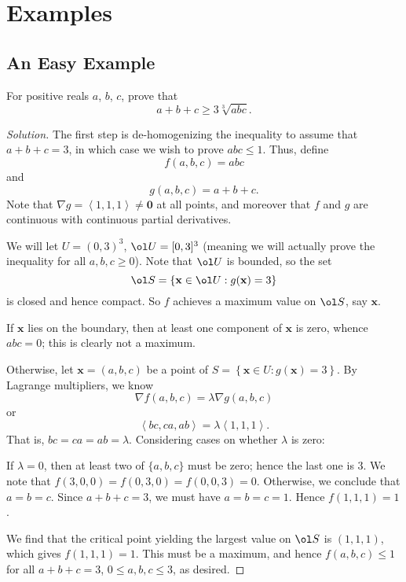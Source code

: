 \documentclass[11pt]{scrartcl}
\begin{document}
\section{Examples}
\subsection{An Easy Example}
\begin{example}
  [AM-GM] For positive reals $a$, $b$, $c$, prove that
  \[ a+b+c \ge 3\sqrt[3]{abc}. \]
\end{example}
\begin{proof}[Solution]
  The first step is de-homogenizing the inequality
  to assume that $a+b+c=3$,
  in which case we wish to prove $abc \le 1$.
  Thus, define
  \[ f(a,b,c) = abc \]
  and
  \[ g(a,b,c) = a+b+c. \]
  Note that $\nabla g = \left<1,1,1\right> \neq \mathbf 0$
  at all points, and moreover that $f$ and $g$ are continuous
  with continuous partial derivatives.

  We will let $U = (0,3)^3$, $\ol U = [0,3]^3$
  (meaning we will actually prove the inequality
  for all $a,b,c \ge 0$).
  Note that $\ol U$ is bounded, so the set
  \[ \ol S = \left\{ \mathbf x \in \ol U : g(\mathbf x) = 3 \right\} \]
  is closed and hence compact.
  So $f$ achieves a maximum value on $\ol S$, say $\mathbf x$.

  If $\mathbf x$ lies on the boundary,
  then at least one component of $\mathbf x$ is zero,
  whence $abc = 0$; this is clearly not a maximum.

  Otherwise, let $\mathbf x = (a,b,c)$ be a point of
  $S = \left\{ \mathbf x \in U : g(\mathbf x) = 3 \right\}$.
  By Lagrange multipliers, we know
  \[ \nabla f(a,b,c) = \lambda \nabla g(a,b,c) \]
  or
  \[ \left< bc, ca, ab \right> = \lambda \left<1,1,1\right>. \]
  That is, $bc = ca = ab = \lambda$.
  Considering cases on whether $\lambda$ is zero:
  \begin{itemize}
    \ii If $\lambda = 0$, then at least two of $\{a,b,c\}$ must be zero; hence the last one is $3$.
    We note that $f(3,0,0) = f(0,3,0) = f(0,0,3) = 0$.
    \ii Otherwise, we conclude that $a=b=c$.
    Since $a+b+c=3$, we must have $a=b=c=1$.
    Hence $f(1,1,1) = 1$.
  \end{itemize}

  We find that the critical point yielding the largest value
  on $\ol S$ is $(1,1,1)$, which gives $f(1,1,1) = 1$.
  This must be a maximum, and hence $f(a,b,c) \le 1$
  for all $a+b+c=3$, $0 \le a,b,c \le 3$, as desired.
\end{proof}
\end{document}
